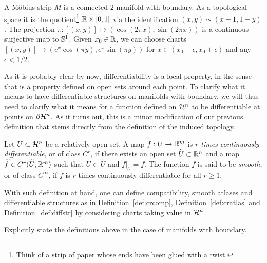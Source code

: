 \begin{example}\label{ex:mobius}
  A M\"obius strip $M$ is a connected $2$-manifold with boundary.
  As a topological space it is the quotient\footnote{Think of a strip of paper whose ends have been glued with a twist.} $\mathbb{R}\times[0,1]$ via the identification $(x,y)\sim(x+1, 1-y)$.
  The projection $\pi: [(x,y)] \mapsto (\cos(2\pi x), \sin(2\pi x))$ is a continuous surjective map to $\mathbb{S}^1$.  Given $x_0\in\mathbb{R}$, we can choose charts $[(x,y)]\mapsto (e^x\cos(\pi y), e^x\sin(\pi y))$ for $x\in(x_0 - \epsilon, x_0 + \epsilon)$ and any $\epsilon < 1/2$.
\end{example}

As it is probably clear by now, differentiability is a local property, in the sense that is a property defined on open sets around each point.
To clarify what it means to have differentiable structures on manifolds with boundary, we will thus need to clarify what it means for a function defined on $\mathcal{H}^n$ to be differentiable at points on $\partial\mathcal{H}^n$.
As it turns out, this is a minor modification of our previous definition that stems directly from the definition of the induced topology.

\begin{definition}
  Let $U\subset\mathcal{H}^n$ be a relatively open set. A map $f: U\to\mathbb{R}^m$ is \emph{$r$-times continuously differentiable}, or of class $C^r$, if there exists an open set $\widetilde U\subset\mathbb{R}^n$ and a map $\widetilde f\in C^r(\widetilde U, \mathbb{R}^m)$ such that $U\subset\widetilde U$ and $\widetilde f|_U = f$.
  The function $f$ is said to be \emph{smooth}, or of class $C^\infty$, if $f$ is $r$-times continuously differentiable for all $r\geq 1$.
\end{definition}

With such definition at hand, one can define compatibility, smooth atlases and differentiable structures as in Definition~\ref{def:crcomp}, Definition~\ref{def:cratlas} and Definition~\ref{def:diffstr} by considering charts taking value in $\mathcal{H}^n$.

\begin{exercise}
  Explicitly state the definitions above in the case of manifolds with boundary.
\end{exercise}


